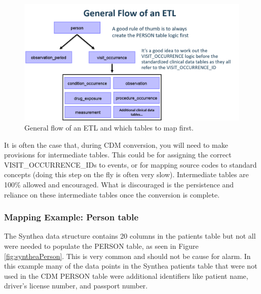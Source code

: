 \documentclass[11pt]{book}
\theoremstyle{definition}
\theoremstyle{definition}
\theoremstyle{definition}
\theoremstyle{remark}
\begin{document}
\begin{figure}
\includegraphics[width=1\linewidth]{images/ExtractTransformLoad/flowOfEtl} \caption{General flow of an ETL and which tables to map first.}\label{fig:etlFlow}
\end{figure}

It is often the case that, during CDM conversion, you will need to make provisions for intermediate tables. This could be for assigning the correct VISIT\_OCCURRENCE\_IDs to events, or for mapping source codes to standard concepts (doing this step on the fly is often very slow). Intermediate tables are 100\% allowed and encouraged. What is discouraged is the persistence and reliance on these intermediate tables once the conversion is complete.

\hypertarget{mapping-example-person-table}{%
\subsubsection*{Mapping Example: Person table}\label{mapping-example-person-table}}

The Synthea data structure contains 20 columns in the patients table but not all were needed to populate the PERSON table, as seen in Figure \ref{fig:syntheaPerson}. This is very common and should not be cause for alarm. In this example many of the data points in the Synthea patients table that were not used in the CDM PERSON table were additional identifiers like patient name, driver's license number, and passport number.
\end{document}
